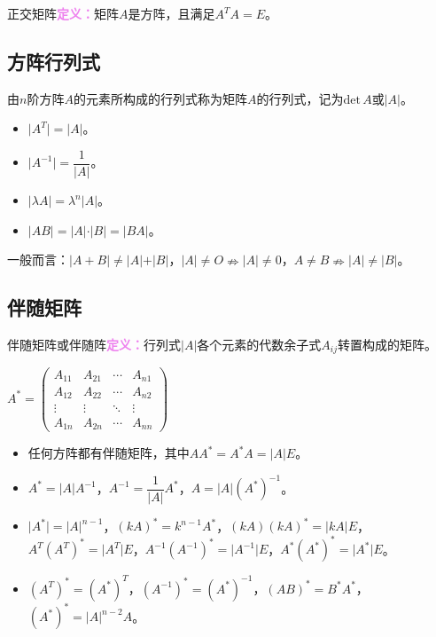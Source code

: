 \documentclass[UTF8, 12pt]{ctexart}
\begin{document}
正交矩阵\textcolor{violet}{\textbf{定义：}}矩阵$A$是方阵，且满足$A^TA=E$。

\subsection{方阵行列式}

由$n$阶方阵$A$的元素所构成的行列式称为矩阵$A$的行列式，记为$\textrm{det}\,A$或$\vert A\vert$。

\begin{itemize}
\item $\vert A^T\vert=\vert A\vert$。
\item $\vert A^{-1}\vert=\dfrac{1}{\vert A\vert}$。
\item $\vert\lambda A\vert=\lambda^n\vert A\vert$。
\item $\vert AB\vert=\vert A\vert\cdot\vert B\vert=\vert BA\vert$。
\end{itemize}

一般而言：$\vert A+B\vert\neq\vert A\vert+\vert B\vert$，$\vert A\vert\neq O\nRightarrow\vert A\vert\neq0$，$A\neq B\nRightarrow\vert A\vert\neq\vert B\vert$。

\subsection{伴随矩阵}

伴随矩阵或伴随阵\textcolor{violet}{\textbf{定义：}}行列式$\vert A\vert$各个元素的代数余子式$A_{ij}$转置构成的矩阵。

$A^*=\left(
\begin{array}{cccc}
A_{11} & A_{21} & \cdots & A_{n1} \\
A_{12} & A_{22} & \cdots & A_{n2} \\
\vdots & \vdots & \ddots & \vdots \\
A_{1n} & A_{2n} & \cdots & A_{nn}
\end{array}
\right)$

\begin{itemize}
\item 任何方阵都有伴随矩阵，其中$AA^*=A^*A=\vert A\vert E$。
\item $A^*=\vert A\vert A^{-1}$，$A^{-1}=\dfrac{1}{\vert A\vert}A^*$，$A=\vert A\vert(A^*)^{-1}$。
\item $\vert A^*\vert=\vert A\vert^{n-1}$，$(kA)^*=k^{n-1}A^*$，$(kA)(kA)^*=\vert kA\vert E$，$A^T(A^T)^*=\vert A^T\vert E$，$A^{-1}(A^{-1})^*=\vert A^{-1}\vert E$，$A^*(A^*)^*=\vert A^*\vert E$。
\item $(A^T)^*=(A^*)^T$，$(A^{-1})^*=(A^*)^{-1}$，$(AB)^*=B^*A^*$，$(A^*)^*=\vert A\vert^{n-2}A$。
\end{itemize}
\end{document}
